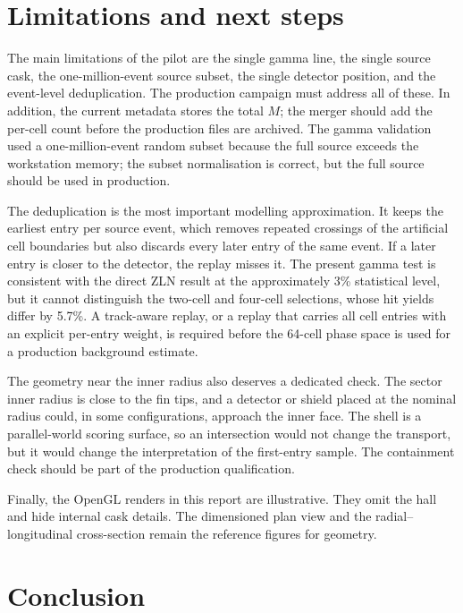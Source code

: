 \documentclass[11pt,a4paper]{article}
\begin{document}
\section{Limitations and next steps}
\label{sec:limits}

The main limitations of the pilot are the single gamma line, the single source
cask, the one-million-event source subset, the single detector position, and the
event-level deduplication. The production campaign must address all of these. In
addition, the current metadata stores the total $M$; the merger should add the
per-cell count before the production files are archived. The gamma validation
used a one-million-event random subset because the full source exceeds the
workstation memory; the subset normalisation is correct, but the full source
should be used in production.

The deduplication is the most important modelling approximation. It keeps the
earliest entry per source event, which removes repeated crossings of the
artificial cell boundaries but also discards every later entry of the same
event. If a later entry is closer to the detector, the replay misses it. The
present gamma test is consistent with the direct ZLN result at the approximately
3\% statistical level, but it cannot distinguish the two-cell and four-cell
selections, whose hit yields differ by 5.7\%. A track-aware replay, or a replay
that carries all cell entries with an explicit per-entry weight, is required
before the 64-cell phase space is used for a production background estimate.

The geometry near the inner radius also deserves a dedicated check. The sector
inner radius is close to the fin tips, and a detector or shield placed at the
nominal radius could, in some configurations, approach the inner face. The shell
is a parallel-world scoring surface, so an intersection would not change the
transport, but it would change the interpretation of the first-entry sample. The
containment check should be part of the production qualification.

Finally, the OpenGL renders in this report are illustrative. They omit the hall
and hide internal cask details. The dimensioned plan view and the
radial--longitudinal cross-section remain the reference figures for geometry.

\section{Conclusion}
\end{document}
